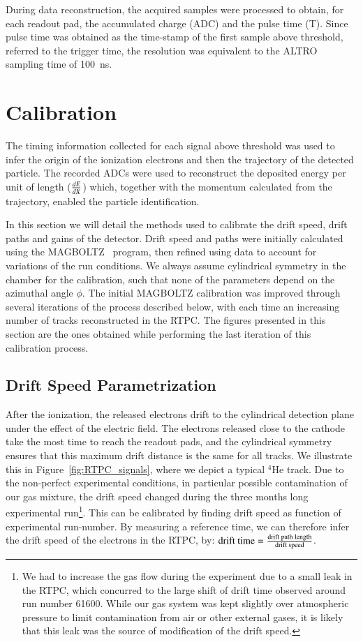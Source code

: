 \documentclass[preprint,5p]{elsarticle}
\begin{document}
During data reconstruction, the acquired samples were processed to obtain, 
for each readout pad, the accumulated charge (ADC) and the pulse time (T). Since 
pulse time was obtained as the time-stamp of the first sample above threshold, 
referred to the trigger time, the resolution was equivalent to the ALTRO 
sampling time of 100~ns.

\section{Calibration} \label{sec_calib}

The timing information collected for each signal above threshold
was used to infer the origin of the ionization electrons and 
then the trajectory of the detected particle. The recorded ADCs were used to reconstruct 
the deposited energy per unit of length ($\small{\frac{dE}{dX}}$) which, 
together with the momentum calculated from the trajectory, enabled the particle 
identification. 

In this section we will detail the methods used to calibrate the drift speed,
drift paths and gains of the detector. Drift speed and paths were initially
calculated using the MAGBOLTZ~\cite{Biagi:1999nwa} program, then refined using
data to account for variations of the run conditions. We always assume 
cylindrical symmetry in the chamber for the calibration, such that none of
the parameters depend on the azimuthal angle $\phi$. The initial MAGBOLTZ
calibration was improved through several iterations of the
process described below, with each time an increasing number of tracks 
reconstructed in the RTPC. The figures presented in this section
are the ones obtained while performing the last iteration of this
calibration process.

\subsection{Drift Speed Parametrization}

After the ionization, the released electrons drift to the cylindrical detection 
plane under the effect of the electric field. The electrons released close to 
the cathode take the most time to reach the readout pads, and the cylindrical 
symmetry ensures that this maximum drift distance is the same for all tracks.  
We illustrate this in Figure~\ref{fig:RTPC_signals}, where we depict a typical 
$^{4}$He track. Due to the non-perfect experimental conditions, in particular 
possible contamination of our gas mixture, the drift speed changed during the 
three months long experimental run\footnote{We had to increase the gas flow 
during the experiment due to a small leak in the RTPC, which concurred to 
the large shift of drift time observed around run number 61600. While our 
gas system was kept slightly over atmospheric pressure to limit 
contamination from air or other external gases, it is likely that this leak was 
the source of modification of the drift speed.}. This can be calibrated by 
finding drift speed as function of experimental run-number. By measuring a 
reference time, we can therefore infer the drift speed of the electrons in the 
RTPC, by: $\textnormal{drift time} = \frac{\textnormal{drift path 
length}}{\textnormal{drift speed}}$.
\end{document}
